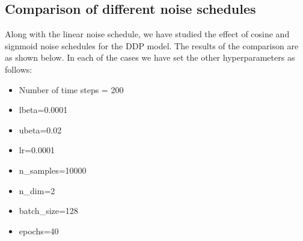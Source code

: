 \documentclass[a4paper,12pt]{article}
\begin{document}
\subsection*{Comparison of different noise schedules}
Along with the linear noise schedule, we have studied the effect of cosine and signmoid noise schedules for the DDP model. The results of the comparison are as shown below. In each of the cases we have set the other hyperparameters as follows:
\begin{itemize}
  \item Number of time steps = 200
  \item lbeta=0.0001
  \item ubeta=0.02
  \item lr=0.0001
  \item n\_samples=10000
  \item n\_dim=2
  \item batch\_size=128
  \item epochs=40
\end{itemize}
\end{document}
